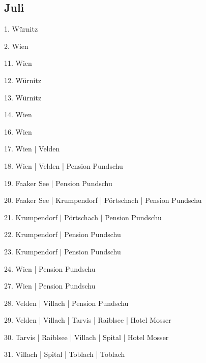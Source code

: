 \documentclass[twoside=false,titlepage=false,open=any, parskip=never, fontsize=10pt, headings=small, chapterprefix=false, appendixprefix=false, DIV=15]{scrbook}
\begin{document}
\begin{multicols}{3}
            \section*{Juli}
            1. Würnitz\par
            2. Wien\par
            11. Wien\par
            12. Würnitz\par
            13. Würnitz\par
            14. Wien\par
            16. Wien\par
            17. Wien | Velden\par
            18. Wien | Velden | Pension Pundschu\par
            19. Faaker See | Pension Pundschu\par
            20. Faaker See | Krumpendorf | Pörtschach | Pension Pundschu\par
            21. Krumpendorf | Pörtschach | Pension Pundschu\par
            22. Krumpendorf | Pension Pundschu\par
            23. Krumpendorf | Pension Pundschu\par
            24. Wien | Pension Pundschu\par
            27. Wien | Pension Pundschu\par
            28. Velden | Villach | Pension Pundschu\par
            29. Velden | Villach | Tarvis | Raiblsee | Hotel Mosser\par
            30. Tarvis | Raiblsee | Villach | Spital | Hotel Mosser\par
            31. Villach | Spital | Toblach | Toblach\par

\end{multicols}
\end{document}
